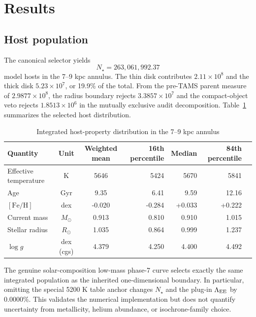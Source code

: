 \section{Results}\label{sec:results}

\subsection{Host population}

The canonical selector yields
\begin{equation}
 N_\star=263{,}061{,}992.37
 \label{eq:nstar_result}
\end{equation}
model hosts in the 7--9 kpc annulus. The thin disk contributes
$2.11\times10^8$ and the thick disk $5.23\times10^7$, or 19.9\% of the total.
From the pre-TAMS parent measure of $2.9877\times10^8$, the radius boundary
rejects $3.3857\times10^7$ and the compact-object veto rejects
$1.8513\times10^6$ in the mutually exclusive audit decomposition.
Table~\ref{tab:demographics} summarizes the selected host distribution.

\begin{table}[t]
\caption{Integrated host-property distribution in the 7--9 kpc annulus}
\label{tab:demographics}
\centering
\begin{tabular}{lccrrrr}
\toprule
Quantity & Unit & Weighted mean & 16th percentile & Median & 84th percentile\\
\midrule
Effective temperature & K & 5646 & 5424 & 5670 & 5841\\
Age & Gyr & 9.35 & 6.41 & 9.59 & 12.16\\
$[\mathrm{Fe/H}]$ & dex & -0.020 & -0.284 & +0.033 & +0.222\\
Current mass & $M_\odot$ & 0.913 & 0.810 & 0.910 & 1.015\\
Stellar radius & $R_\odot$ & 1.035 & 0.864 & 0.999 & 1.237\\
$\log g$ & dex (cgs) & 4.379 & 4.250 & 4.400 & 4.492\\
\bottomrule
\end{tabular}
\end{table}

The genuine solar-composition low-mass phase-7 curve selects exactly the same
integrated population as the inherited one-dimensional boundary. In
particular, omitting the special 5200 K table anchor changes $N_\star$ and the
plug-in $\Lambda_{\rm EE}$ by 0.0000\%. This validates the numerical implementation but
does not quantify uncertainty from metallicity, helium abundance, or
isochrone-family choice.

